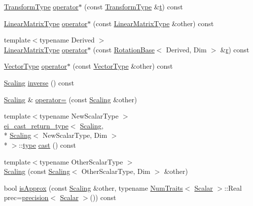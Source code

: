 \begin{DoxyCompactItemize}
\item 
\hyperlink{class_scaling_acee313a178d65c86e0de34b9b9cc4f7f}{Transform\-Type} \hyperlink{class_scaling_afc8e8fc4a6507f9e1f56331fc64c635b}{operator$\ast$} (const \hyperlink{class_scaling_acee313a178d65c86e0de34b9b9cc4f7f}{Transform\-Type} \&\hyperlink{glext_8h_a00140d6f5c548b26daf170bf16e86a6d}{t}) const 
\item 
\hyperlink{class_scaling_a6c8c9048c2ccf7378efb46c075ec7333}{Linear\-Matrix\-Type} \hyperlink{class_scaling_a529100fd69eb32a94964c5141e61b35f}{operator$\ast$} (const \hyperlink{class_scaling_a6c8c9048c2ccf7378efb46c075ec7333}{Linear\-Matrix\-Type} \&other) const 
\item 
{\footnotesize template$<$typename Derived $>$ }\\\hyperlink{class_scaling_a6c8c9048c2ccf7378efb46c075ec7333}{Linear\-Matrix\-Type} \hyperlink{class_scaling_a78496eac9d118329133eefe1fb4e04a6}{operator$\ast$} (const \hyperlink{class_rotation_base}{Rotation\-Base}$<$ Derived, Dim $>$ \&\hyperlink{glext_8h_abe08814c2f72843fde4d8df41440d5a0}{r}) const 
\item 
\hyperlink{class_scaling_a48ec70d6974c8d2c90ad7ca7a5c16f97}{Vector\-Type} \hyperlink{class_scaling_a007e70998f8cd48259ce2447f33d46fa}{operator$\ast$} (const \hyperlink{class_scaling_a48ec70d6974c8d2c90ad7ca7a5c16f97}{Vector\-Type} \&other) const 
\item 
\hyperlink{class_scaling}{Scaling} \hyperlink{class_scaling_a3c0d67af6139a4982b387e1afb6263c5}{inverse} () const 
\item 
\hyperlink{class_scaling}{Scaling} \& \hyperlink{class_scaling_aa091e2d80e9e0327cf02ca0a97a576ff}{operator=} (const \hyperlink{class_scaling}{Scaling} \&other)
\item 
{\footnotesize template$<$typename New\-Scalar\-Type $>$ }\\\hyperlink{structei__cast__return__type}{ei\-\_\-cast\-\_\-return\-\_\-type}$<$ \hyperlink{class_scaling}{Scaling}, \\*
\hyperlink{class_scaling}{Scaling}$<$ New\-Scalar\-Type, Dim $>$\\*
 $>$\-::\hyperlink{glext_8h_a7d05960f4f1c1b11f3177dc963a45d86}{type} \hyperlink{class_scaling_a71f4fdd6e04598724c7bd43f53928d28}{cast} () const 
\item 
{\footnotesize template$<$typename Other\-Scalar\-Type $>$ }\\\hyperlink{class_scaling_a12b66fc641d5fe633afcb7ac13f6f93c}{Scaling} (const \hyperlink{class_scaling}{Scaling}$<$ Other\-Scalar\-Type, Dim $>$ \&other)
\item 
bool \hyperlink{class_scaling_a25800b0ceb6249e570b248e5969250dd}{is\-Approx} (const \hyperlink{class_scaling}{Scaling} \&other, typename \hyperlink{struct_num_traits}{Num\-Traits}$<$ \hyperlink{class_scaling_a3e27d3992328c2ebeb624ddc129659d1}{Scalar} $>$\-::Real prec=\hyperlink{_math_functions_8h_a3dc1c65cf9dc9b5a7ee66472d0ae83e1}{precision}$<$ \hyperlink{class_scaling_a3e27d3992328c2ebeb624ddc129659d1}{Scalar} $>$()) const 
\end{DoxyCompactItemize}
